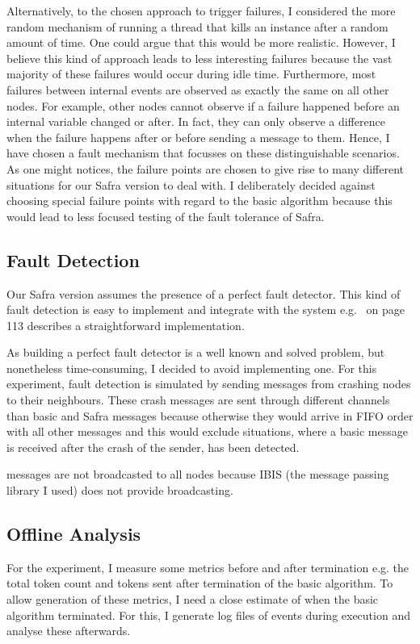 Alternatively, to the chosen approach to trigger failures, I considered the more random mechanism of running a thread that kills an instance after a random amount of time.
One could argue that this would be more realistic.
However, I believe this kind of approach leads to less interesting failures because the vast majority of these failures would occur during idle time.
Furthermore, most failures between internal events are observed as exactly the same on all other nodes.
For example, other nodes cannot observe if a failure happened before an internal variable changed or after.
In fact, they can only observe a difference when the failure happens after or before sending a message to them.
Hence, I have chosen a fault mechanism that focusses on these distinguishable scenarios.
As one might notices, the failure points are chosen to give rise to many different situations for our Safra version to deal with.
I deliberately decided against choosing special failure points with regard to the basic algorithm because this would lead to less focused testing of the fault tolerance of Safra.

\subsection{Fault Detection}
Our Safra version assumes the presence of a perfect fault detector.
This kind of fault detection is easy to implement and integrate with the system e.g.~\cite{fokkink:2018} on page 113 describes a straightforward implementation.

As building a perfect fault detector is a well known and solved problem, but nonetheless time-consuming, I decided to avoid implementing one.
For this experiment, fault detection is simulated by sending  messages from crashing nodes to their neighbours.
These crash messages are sent through different channels than basic and Safra messages because otherwise they would arrive in FIFO order with all other messages and this would exclude situations, where a basic message is received after the crash of the sender, has been detected.

 messages are not broadcasted to all nodes because IBIS (the message passing library I used) does not provide broadcasting.

\subsection{Offline Analysis}
\label{ssec:offline-analysis}
For the experiment, I measure some metrics before and after termination e.g. the total token count and tokens sent after termination of the basic algorithm.
To allow generation of these metrics, I need a close estimate of when the basic algorithm terminated.
For this, I generate log files of events during execution and analyse these afterwards.

